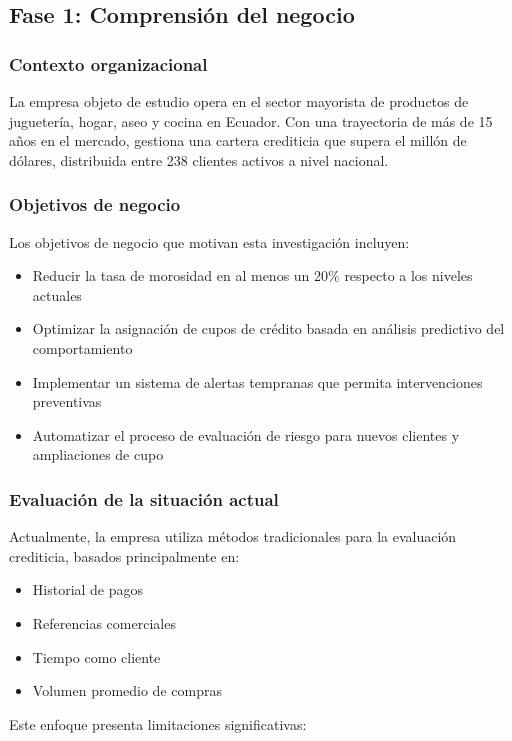 \subsection{Fase 1: Comprensión del negocio}
\subsubsection{Contexto organizacional}
La empresa objeto de estudio opera en el sector mayorista de productos de juguetería, hogar, aseo y cocina en Ecuador. Con una trayectoria de más de 15 años en el mercado, gestiona una cartera crediticia que supera el millón de dólares, distribuida entre 238 clientes activos a nivel nacional.

\subsubsection{Objetivos de negocio}
Los objetivos de negocio que motivan esta investigación incluyen:

\begin{itemize}
    \item Reducir la tasa de morosidad en al menos un 20\% respecto a los niveles actuales
    \item Optimizar la asignación de cupos de crédito basada en análisis predictivo del comportamiento
    \item Implementar un sistema de alertas tempranas que permita intervenciones preventivas
    \item Automatizar el proceso de evaluación de riesgo para nuevos clientes y ampliaciones de cupo
\end{itemize}

\subsubsection{Evaluación de la situación actual}
Actualmente, la empresa utiliza métodos tradicionales para la evaluación crediticia, basados principalmente en:

\begin{itemize}
    \item Historial de pagos
    \item Referencias comerciales
    \item Tiempo como cliente
    \item Volumen promedio de compras
\end{itemize}

Este enfoque presenta limitaciones significativas:

